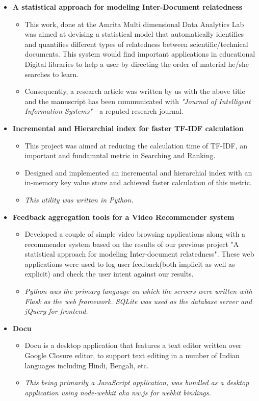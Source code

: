 \documentclass[letterpaper,11pt]{article}
\newcommand{\resitem}[1]{\item #1 \vspace{-2pt}}
\newcommand{\resheading}[1]{\textbf{\sffamily{\mbox{~}{\large #1} \vphantom{p\^{E}}}}}
\begin{document}
\resheading{Projects}
\begin{itemize}
\item[]
	\textbf{A statistical approach for modeling Inter-Document relatedness}
	\vspace{-3mm}
	\begin{itemize}
		\resitem{This work, done at the Amrita Multi dimensional Data Analytics Lab was aimed at devising a statistical model that automatically identifies and quantifies different types of relatedness between scientific/technical documents. This system would find important applications in educational Digital libraries to help a user by directing the order of material he/she searches to learn.}
		\resitem{Consequently, a research article was written by us with the above title and the manuscript has been communicated with \textit{"Journal of Intelligent Information Systems"} - a reputed research journal.}
	\end{itemize}

\item[]
	\textbf{Incremental and Hierarchial index for faster TF-IDF calculation}
	\vspace{-3mm}
	\begin{itemize}
	    \resitem{This project was aimed at reducing the calculation time of TF-IDF, an important and fundamntal metric in Searching and Ranking.}
		\resitem{Designed and implemented an incremental and hierarchial index with an in-memory key value store and achieved faster calculation of this metric.}
		\resitem{\textit{This utility was written in Python.}}
	\end{itemize}

\item[]
	\textbf{Feedback aggregation tools for a Video Recommender system}
	\vspace{-3mm}
	\begin{itemize}
		\resitem{Developed a couple of simple video browsing applications along with a recommender system based on the results of our previous project "A statistical approach for modeling Inter-document relatedness". These web applications were used to log user feedback(both implicit as well as explicit) and check the user intent against our results.}
		\resitem{\textit{Python was the primary language on which the servers were written with Flask as the web framework. SQLite was used as the database server and jQuery for frontend.}}
	\end{itemize}

\item[]
	\textbf{Docu}
	\vspace{-3mm}
	\begin{itemize}
		\resitem{Docu is a desktop application that features a text editor written over Google Closure editor, to support text editing in a number of Indian languages including Hindi, Bengali, etc.}
		\resitem{\textit{This being primarily a JavaScript application, was bundled as a desktop application using node-webkit aka nw.js for webkit bindings.}}
	\end{itemize}


\end{itemize}
\end{document}
